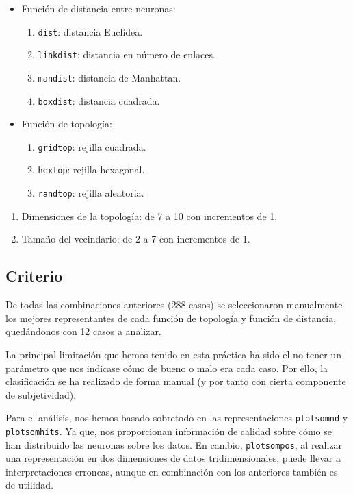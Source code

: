\documentclass[a4paper,12pt,titlepage]{article}
\begin{document}
\begin{itemize}[noitemsep]
	\item  Función de distancia entre neuronas: \citep{matlab:distance}
	\begin{enumerate}[noitemsep]
		\item \lstinline|dist|: distancia Euclídea.
		\item \lstinline|linkdist|: distancia en número de enlaces.
		\item \lstinline|mandist|: distancia de Manhattan.
		\item \lstinline|boxdist|: distancia cuadrada.
	\end{enumerate}
	\item Función de topología: \citep{matlab:topologies}
	\begin{enumerate}[noitemsep]
		\item \lstinline|gridtop|: rejilla cuadrada.
		\item \lstinline|hextop|: rejilla hexagonal.
		\item \lstinline|randtop|: rejilla aleatoria.
	\end{enumerate}	
\end{itemize}
\begin{enumerate}[noitemsep]
	\item Dimensiones de la topología: de 7 a 10 con incrementos de 1.
	\item Tamaño del vecindario: de 2 a 7 con incrementos de 1.
\end{enumerate}

\subsection{Criterio}

De todas las combinaciones anteriores (288 casos) se seleccionaron manualmente los mejores representantes de cada función de topología y función de distancia, quedándonos con 12 casos a analizar.

La principal limitación que hemos tenido en esta práctica ha sido el no tener un parámetro que nos indicase cómo de bueno o malo era cada caso. Por ello, la clasificación se ha realizado de forma manual (y por tanto con cierta componente de subjetividad).

Para el análisis, nos hemos basado sobretodo en las representaciones \lstinline|plotsomnd| y \lstinline|plotsomhits|. Ya que, nos proporcionan información de calidad sobre cómo se han distribuido las neuronas sobre los datos. En cambio, \lstinline|plotsompos|, al realizar una representación en 
dos dimensiones de datos tridimensionales, puede llevar a interpretaciones erroneas, aunque en combinación con los anteriores también es de utilidad.
\end{document}
